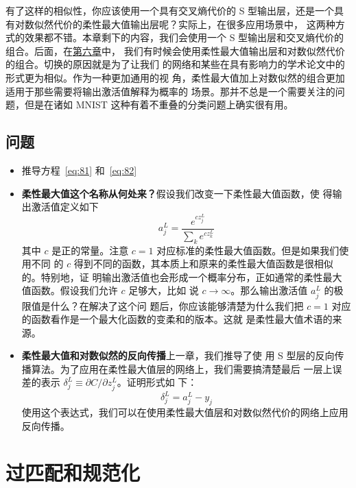 有了这样的相似性，你应该使用一个具有交叉熵代价的 S 型输出层，还是一个具有对数似然代价的柔性最大值输出层呢？实际上，在很多应用场景中，
这两种方式的效果都不错。本章剩下的内容，我们会使用一个 S 型输出层和交叉熵代价的组合。后面，在\hyperref[ch:Deeplearning]{第六章}中，
我们有时候会使用柔性最大值输出层和对数似然代价的组合。切换的原因就是为了让我们
的网络和某些在具有影响力的学术论文中的形式更为相似。作为一种更加通用的视
角，柔性最大值加上对数似然的组合更加适用于那些需要将输出激活值解释为概率的
场景。那并不总是一个需要关注的问题，但是在诸如 MNIST 这种有着不重叠的分类问题上确实很有用。

\subsection*{问题}

\begin{itemize}
\item 推导方程~\eqref{eq:81} 和~\eqref{eq:82}
\item \textbf{柔性最大值这个名称从何处来？}\quad 假设我们改变一下柔性最大值函数，使
  得输出激活值定义如下
  \begin{equation}
    a^L_j = \frac{e^{c z^L_j}}{\sum_k e^{c z^L_k}}
    \label{eq:83}\tag{83}
  \end{equation}
  其中 $c$ 是正的常量。注意 $c=1$ 对应标准的柔性最大值函数。但是如果我们使用不同
  的 $c$ 得到不同的函数，其本质上和原来的柔性最大值函数是很相似的。特别地，证
  明输出激活值也会形成一个概率分布，正如通常的柔性最大值函数。假设我们允许 $c$ 足够大，比如
  说 $c\rightarrow \infty$。那么输出激活值 $a_j^L$ 的极限值是什么？在解决了这个问
  题后，你应该能够清楚为什么我们把 $c=1$ 对应的函数看作是一个最大化函数的变柔和的版本。这就
  是柔性最大值术语的来源。
\item \textbf{柔性最大值和对数似然的反向传播}\quad 上一章，我们推导了使
  用 S 型层的反向传播算法。为了应用在柔性最大值层的网络上，我们需要搞清楚最后
  一层上误差的表示 $\delta^L_j \equiv \partial C / \partial z^L_j$。证明形式如
  下：
  \begin{equation}
    \delta^L_j = a^L_j -y_j
    \label{eq:84}\tag{84}
  \end{equation}
  使用这个表达式，我们可以在使用柔性最大值层和对数似然代价的网络上应用反向传播。
\end{itemize}

\section{过匹配和规范化}
\label{sec:overfitting_and_regularization}

